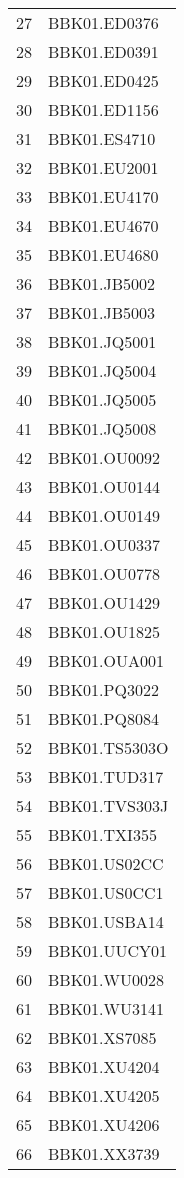\documentclass[11pt]{article}
\begin{document}
\begin{table}[ht]
\begin{tabular}{rl}
  27 & BBK01.ED0376 \\ 
  28 & BBK01.ED0391 \\ 
  29 & BBK01.ED0425 \\ 
  30 & BBK01.ED1156 \\ 
  31 & BBK01.ES4710 \\ 
  32 & BBK01.EU2001 \\ 
  33 & BBK01.EU4170 \\ 
  34 & BBK01.EU4670 \\ 
  35 & BBK01.EU4680 \\ 
  36 & BBK01.JB5002 \\ 
  37 & BBK01.JB5003 \\ 
  38 & BBK01.JQ5001 \\ 
  39 & BBK01.JQ5004 \\ 
  40 & BBK01.JQ5005 \\ 
  41 & BBK01.JQ5008 \\ 
  42 & BBK01.OU0092 \\ 
  43 & BBK01.OU0144 \\ 
  44 & BBK01.OU0149 \\ 
  45 & BBK01.OU0337 \\ 
  46 & BBK01.OU0778 \\ 
  47 & BBK01.OU1429 \\ 
  48 & BBK01.OU1825 \\ 
  49 & BBK01.OUA001 \\ 
  50 & BBK01.PQ3022 \\ 
  51 & BBK01.PQ8084 \\ 
  52 & BBK01.TS5303O \\ 
  53 & BBK01.TUD317 \\ 
  54 & BBK01.TVS303J \\ 
  55 & BBK01.TXI355 \\ 
  56 & BBK01.US02CC \\ 
  57 & BBK01.US0CC1 \\ 
  58 & BBK01.USBA14 \\ 
  59 & BBK01.UUCY01 \\ 
  60 & BBK01.WU0028 \\ 
  61 & BBK01.WU3141 \\ 
  62 & BBK01.XS7085 \\ 
  63 & BBK01.XU4204 \\ 
  64 & BBK01.XU4205 \\ 
  65 & BBK01.XU4206 \\ 
  66 & BBK01.XX3739 \\ 
\end{tabular}
\end{table}
\end{document}
